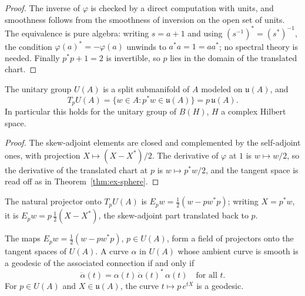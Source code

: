 \begin{proof}
  \leanok
  The inverse of $\varphi$ is checked by a direct computation with units, and smoothness follows
  from the smoothness of inversion on the open set of units. The equivalence is pure algebra:
  writing $s = a + 1$ and using $(s^{-1})^* = (s^*)^{-1}$, the condition
  $\varphi(a)^* = -\varphi(a)$ unwinds to $a^* a = 1 = a a^*$; no spectral theory is needed.
  Finally $p^* p + 1 = 2$ is invertible, so $p$ lies in the domain of the translated chart.
\end{proof}

\begin{theorem}
  \label{thm:ex-unitary}
  \leanok
  The unitary group $U(A)$ is a split submanifold of $A$ modeled on $\mathfrak u(A)$, and
  \[
    T_pU(A) = \{w \in A : p^* w \in \mathfrak u(A)\} = p\,\mathfrak u(A) .
  \]
  In particular this holds for the unitary group of $B(H)$, $H$ a complex Hilbert space.
\end{theorem}

\begin{proof}
  \leanok
  The skew-adjoint elements are closed and complemented by the self-adjoint ones, with
  projection $X \mapsto (X - X^*)/2$. The derivative of $\varphi$ at $1$ is $w \mapsto w/2$, so
  the derivative of the translated chart at $p$ is $w \mapsto p^* w/2$, and the tangent space
  is read off as in Theorem~\ref{thm:ex-sphere}.
\end{proof}

The natural projector onto $T_pU(A)$ is $E_p w = \tfrac12(w - p w^* p)$; writing $X = p^* w$, it
is $E_p w = p\,\tfrac12(X - X^*)$, the skew-adjoint part translated back to $p$.

\begin{theorem}
  \label{thm:ex-unitary-geodesics}
  \leanok
  The maps $E_p w = \tfrac12(w - p w^* p)$, $p \in U(A)$, form a field of projectors onto the
  tangent spaces of $U(A)$. A curve $\alpha$ in $U(A)$ whose ambient curve is smooth is a
  geodesic of the associated connection if and only if
  \[
    \ddot\alpha(t) = \alpha(t)\, \ddot\alpha(t)^*\, \alpha(t) \quad \text{for all } t .
  \]
  For $p \in U(A)$ and $X \in \mathfrak u(A)$, the curve $t \mapsto p\, e^{tX}$ is a geodesic.
\end{theorem}

